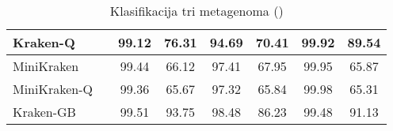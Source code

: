 \documentclass[times, utf8, zavrsni]{fer}
\begin{document}
\begin{table}[htb]
{\begin{tabular}{|llcccccc|}
			Kraken-Q              & \multicolumn{1}{l|}{} & \multicolumn{1}{c|}{99.12}    & \multicolumn{1}{c|}{76.31}      & \multicolumn{1}{c|}{94.69}    & \multicolumn{1}{c|}{70.41}      & \multicolumn{1}{c|}{99.92}    & 89.54                            \\ \hline
			MiniKraken            & \multicolumn{1}{l|}{} & \multicolumn{1}{c|}{99.44}    & \multicolumn{1}{c|}{66.12}      & \multicolumn{1}{c|}{97.41}    & \multicolumn{1}{c|}{67.95}      & \multicolumn{1}{c|}{99.95}    & 65.87                            \\ \hline
			MiniKraken-Q          & \multicolumn{1}{l|}{} & \multicolumn{1}{c|}{99.36}    & \multicolumn{1}{c|}{65.67}      & \multicolumn{1}{c|}{97.32}    & \multicolumn{1}{c|}{65.84}      & \multicolumn{1}{c|}{99.98}    & 65.31                            \\ \hline
			Kraken-GB             & \multicolumn{1}{l|}{} & \multicolumn{1}{c|}{99.51}    & \multicolumn{1}{c|}{93.75}      & \multicolumn{1}{c|}{98.48}    & \multicolumn{1}{c|}{86.23}      & \multicolumn{1}{c|}{99.48}    & 91.13                            \\ \hline
		\end{tabular}%
	}
	\caption{Klasifikacija tri metagenoma (\cite{Kraken})}
	\label{StatRez}
\end{table}
\end{document}
